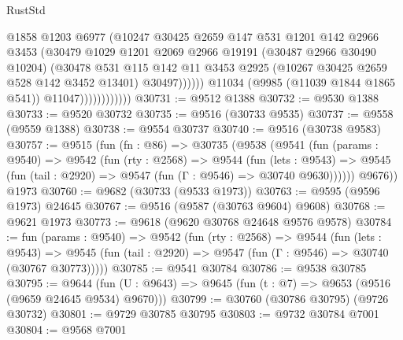 \begin{lexlean}{RustStd}
\begin{coremodule}
                                  @1858
                                  @1203
                                  @6977
                                  (@10247
                                    @30425
                                    @2659
                                    @147
                                    @531
                                    @1201
                                    @142
                                    @2966
                                    @3453
                                    (@30479
                                      @1029
                                      @1201
                                      @2069
                                      @2966
                                      @19191
                                      (@30487 @2966 @30490 @10204)
                                      (@30478
                                        @531
                                        @115
                                        @142
                                        @11
                                        @3453
                                        @2925
                                        (@10267 @30425 @2659 @528 @142 @3452 @13401)
                                        @30497))))))
                            @11034
                            (@9985 (@11039 @1844 @1865 @541))
                            @11047))))))))))))
@30731 := @9512 @1388
@30732 := @9530 @1388
@30733 := @9520 @30732
@30735 := @9516 (@30733 @9535)
@30737 := @9558 (@9559 @1388)
@30738 := @9554 @30737
@30740 := @9516 (@30738 @9583)
@30757 := @9515
    (fun (fn : @86) =>
    @30735
      (@9538
        (@9541
          (fun (params : @9540) =>
          @9542
            (fun (rty : @2568) =>
            @9544
              (fun (lets : @9543) =>
              @9545 (fun (tail : @2920) => @9547 (fun (Γ : @9546) => @30740 @9630))))))
        @9676))
    @1973
@30760 := @9682 (@30733 (@9533 @1973))
@30763 := @9595 (@9596 @1973) @24645
@30767 := @9516 (@9587 (@30763 @9604) @9608)
@30768 := @9621 @1973
@30773 := @9618 (@9620 @30768 @24648 @9576 @9578)
@30784 := fun (params : @9540) =>
  @9542
    (fun (rty : @2568) =>
    @9544
      (fun (lets : @9543) =>
      @9545 (fun (tail : @2920) => @9547 (fun (Γ : @9546) => @30740 (@30767 @30773)))))
@30785 := @9541 @30784
@30786 := @9538 @30785
@30795 := @9644
    (fun (U : @9643) => @9645 (fun (t : @7) => @9653 (@9516 (@9659 @24645 @9534) @9670)))
@30799 := @30760 (@30786 @30795) (@9726 @30732)
@30801 := @9729 @30785 @30795
@30803 := @9732 @30784 @7001
@30804 := @9568 @7001

\end{coremodule}
\end{lexlean}
